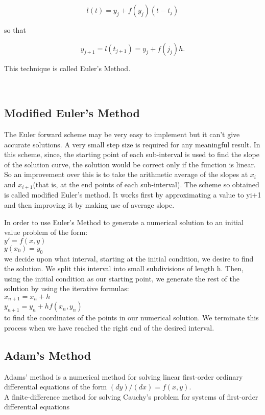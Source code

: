 \[ l(t) = y_j + f(y_j) (t-t_j) \]

so that

\[ y_{j+1} = l(t_{j+1}) = y_j + f(j_j) h. \]

This technique is called Euler's Method. 



\
\
\subsection{Modified Euler's Method}
The Euler forward scheme may be very easy to implement but it can't give accurate solutions.    A  very small step size is required for any meaningful result.  In this scheme, since, the starting point of each sub-interval is used to find the slope of the solution curve,  the solution would be correct only if the function is linear. So an improvement over this is to take the arithmetic average of the slopes at $x_{i}$  and $x_{i+1}$(that is, at the end points of each sub-interval). The scheme so obtained is called modified Euler's method. It works first by approximating a value to yi+1 and then improving it by making use of average slope.

In order to use Euler's Method to generate a numerical solution to an initial value problem of the form:\\

$y′ = f(x, y)$\\

$y(x_0) = y_0$\\

we decide upon what interval, starting at the initial condition, we desire to find the solution. We split this interval into small subdivisions of length h. Then, using the initial condition as our starting point, we generate the rest of the solution by using the iterative formulas:\\

$x_{n+1} = x_{n} + h$\\

$y_{n+1} = y_{n} + h f(x_{n}, y_{n})$\\

to find the coordinates of the points in our numerical solution. We terminate this process when we have reached the right end of the desired interval.
\
\
\subsection{Adam's Method}
 Adams' method is a numerical method for solving linear first-order ordinary differential equations of the form
 $(dy)/(dx)=f(x,y)$.	\\
 A finite-difference method for solving Cauchy's problem for systems of first-order differential equations
 
